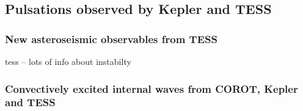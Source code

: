 {\color{blue}
\subsection{Pulsations observed by Kepler and TESS}



\subsubsection{New asteroseismic observables from TESS}

tess -- lots of info about instabilty 

\subsubsection{Convectively excited internal waves from COROT, Kepler and TESS}


}